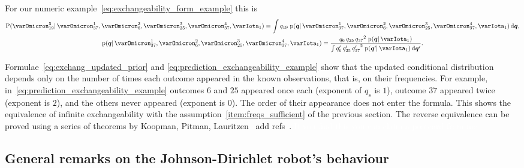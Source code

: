 \documentclass[\ifafour a4paper,12pt,\else a5paper,10pt,\fi%
onecolumn,oneside,article,%
british%
]{memoir}
\theoremstyle{remark}
\theoremstyle{innote}
\newcommand*{\di}{\mathrm{d}}%
\newcommand*{\pf}{\mathrm{p}}%
\newcommand*{\p}{\mathrm{P}}%
\renewcommand*{\|}{\mathpunct{|}}
\newcommand*{\puzzle}{\maltese}
\newcommand{\mynote}[1]{ {\color{notecolour}\puzzle\ #1\ }}
\newcommand*{\yqq}{q}
\newcommand*{\yq}{\bm{\yqq}}
\newcommand*{\yI}{\varIota}
\newcommand*{\yMJ}{\yI_1}
\begin{document}
For our numeric example~\eqref{eq:exchangeability_form_example} this is
\begin{subequations}\label{eq:prediction_exchangeability_example}
  \begin{gather}
    \p(\varOmicron^5_{19} \| \varOmicron^1_{37} , \varOmicron^2_{6} , \varOmicron^3_{25}, \varOmicron^4_{37}, \yMJ)
    = \int \yqq_{19}\; \pf(\yq \|  \varOmicron^1_{37} , \varOmicron^2_{6} , \varOmicron^3_{25}, \varOmicron^4_{37}, \yMJ)\,\di\yq,
    \\
    \pf(\yq \|  \varOmicron^1_{37} , \varOmicron^2_{6} , \varOmicron^3_{25}, \varOmicron^4_{37}, \yMJ)
    = \frac{ \yqq_{6}\, \yqq_{25} \, {\yqq_{37}}^2\; \pf(\yq \| \yMJ)
    }{
      \int \yqq_{6}'\, \yqq_{25}' \, {\yqq_{37}'}^2\; \pf(\yq' \| \yMJ)\,\di\yq'
    }.
  \end{gather}
\end{subequations}

Formulae~\eqref{eq:exchang_updated_prior} and
\eqref{eq:prediction_exchangeability_example} show that the updated
conditional distribution depends only on the number of times each outcome
appeared in the known observations, that is, on their frequencies. For
example, in~\eqref{eq:prediction_exchangeability_example} outcomes $6$ and
$25$ appeared once each (exponent of $\yqq_s$ is $1$), outcome $37$
appeared twice (exponent is $2$), and the others never appeared (exponent
is $0$). The order of their appearance does not enter the formula. This
shows the equivalence of infinite exchangeability with the
assumption~\ref{item:freqs_sufficient} of the previous section. The reverse
equivalence can be proved using a series of theorems by Koopman, Pitman,
Lauritzen\mynote{add refs}. \textcolor{white}{If you find this you can
  claim a postcard from me.}
%



\subsection{General remarks on the Johnson-Dirichlet robot's behaviour}
\label{sec:remarks}
\end{document}

